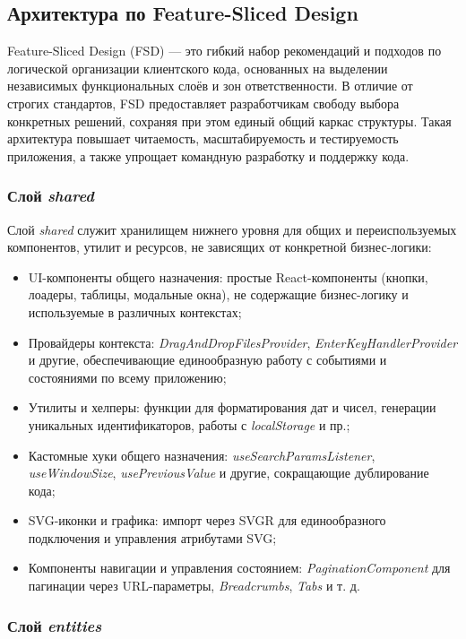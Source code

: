 \subsection{Архитектура по Feature-Sliced Design}

Feature-Sliced Design (FSD) — это гибкий набор рекомендаций и подходов по логической организации клиентского кода, основанных на выделении независимых функциональных слоёв и зон ответственности. В отличие от строгих стандартов, FSD предоставляет разработчикам свободу выбора конкретных решений, сохраняя при этом единый общий каркас структуры. Такая архитектура повышает читаемость, масштабируемость и тестируемость приложения, а также упрощает командную разработку и поддержку кода.

\subsubsection{Слой \textit{shared}}

Слой \textit{shared} служит хранилищем нижнего уровня для общих и переиспользуемых компонентов, утилит и ресурсов, не зависящих от конкретной бизнес-логики:
\begin{itemize}
  \item UI-компоненты общего назначения: простые React-компоненты (кнопки, лоадеры, таблицы, модальные окна), не содержащие бизнес-логику и используемые в различных контекстах;
  \item Провайдеры контекста: \textit{DragAndDropFilesProvider}, \textit{EnterKeyHandlerProvider} и другие, обеспечивающие единообразную работу с событиями и состояниями по всему приложению;
  \item Утилиты и хелперы: функции для форматирования дат и чисел, генерации уникальных идентификаторов, работы с \textit{localStorage} и пр.;
  \item Кастомные хуки общего назначения: \textit{useSearchParamsListener}, \textit{useWindowSize}, \textit{usePreviousValue} и другие, сокращающие дублирование кода;
  \item SVG-иконки и графика: импорт через SVGR для единообразного подключения и управления атрибутами SVG;
  \item Компоненты навигации и управления состоянием: \textit{PaginationComponent} для пагинации через URL-параметры, \textit{Breadcrumbs}, \textit{Tabs} и т. д.
\end{itemize}

\subsubsection{Слой \textit{entities}}

